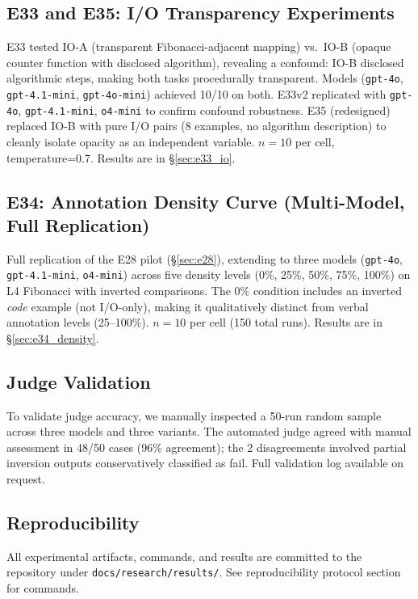 \subsection{E33 and E35: I/O Transparency Experiments}
\label{sec:e33e35}
E33 tested IO-A (transparent Fibonacci-adjacent mapping) vs.\ IO-B (opaque counter function with disclosed algorithm), revealing a confound: IO-B disclosed algorithmic steps, making both tasks procedurally transparent. Models (\texttt{gpt-4o}, \texttt{gpt-4.1-mini}, \texttt{gpt-4o-mini}) achieved 10/10 on both. E33v2 replicated with \texttt{gpt-4o}, \texttt{gpt-4.1-mini}, \texttt{o4-mini} to confirm confound robustness. E35 (redesigned) replaced IO-B with pure I/O pairs (8 examples, no algorithm description) to cleanly isolate opacity as an independent variable. $n=10$ per cell, temperature=0.7. Results are in \S\ref{sec:e33_io}.

\subsection{E34: Annotation Density Curve (Multi-Model, Full Replication)}
\label{sec:e34}
Full replication of the E28 pilot (\S\ref{sec:e28}), extending to three models (\texttt{gpt-4o}, \texttt{gpt-4.1-mini}, \texttt{o4-mini}) across five density levels (0\%, 25\%, 50\%, 75\%, 100\%) on L4 Fibonacci with inverted comparisons. The 0\% condition includes an inverted \emph{code} example (not I/O-only), making it qualitatively distinct from verbal annotation levels (25--100\%). $n=10$ per cell (150 total runs). Results are in \S\ref{sec:e34_density}.

\subsection{Judge Validation}
\label{sec:judge_validation}
To validate judge accuracy, we manually inspected a 50-run random sample across three models and three variants. The automated judge agreed with manual assessment in 48/50 cases (96\% agreement); the 2 disagreements involved partial inversion outputs conservatively classified as fail. Full validation log available on request.

\subsection{Reproducibility}
All experimental artifacts, commands, and results are committed to the repository under \texttt{docs/research/results/}. See reproducibility protocol section for commands.
